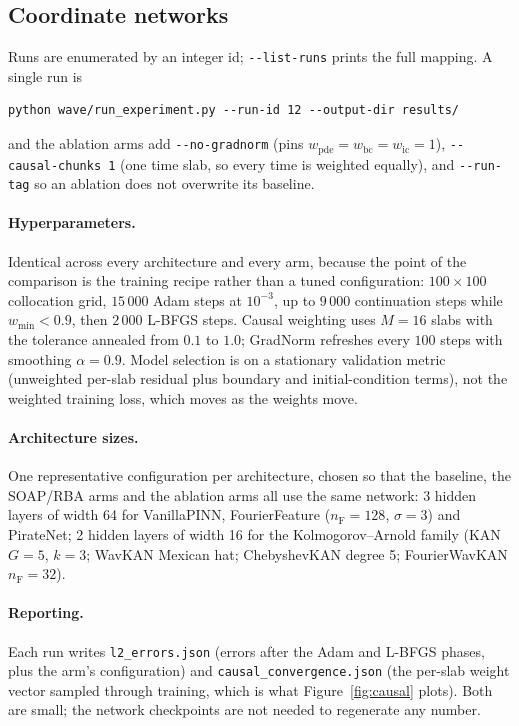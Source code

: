 \subsection{Coordinate networks}

Runs are enumerated by an integer id; \verb|--list-runs| prints the full
mapping. A single run is

\begin{verbatim}
python wave/run_experiment.py --run-id 12 --output-dir results/
\end{verbatim}

and the ablation arms add \verb|--no-gradnorm| (pins
$w_{\mathrm{pde}} = w_{\mathrm{bc}} = w_{\mathrm{ic}} = 1$),
\verb|--causal-chunks 1| (one time slab, so every time is weighted equally),
and \verb|--run-tag| so an ablation does not overwrite its baseline.

\paragraph{Hyperparameters.} Identical across every architecture and every arm,
because the point of the comparison is the training recipe rather than a tuned
configuration: $100 \times 100$ collocation grid, $15\,000$ Adam steps at
$10^{-3}$, up to $9\,000$ continuation steps while $w_{\min} < 0.9$, then
$2\,000$ L-BFGS steps. Causal weighting uses $M = 16$ slabs with the tolerance
annealed from $0.1$ to $1.0$; GradNorm refreshes every $100$ steps with
smoothing $\alpha = 0.9$. Model selection is on a stationary validation metric
(unweighted per-slab residual plus boundary and initial-condition terms), not
the weighted training loss, which moves as the weights move.

\paragraph{Architecture sizes.} One representative configuration per
architecture, chosen so that the baseline, the SOAP/RBA arms and the ablation
arms all use the same network: 3 hidden layers of width 64 for VanillaPINN,
FourierFeature ($n_{\mathrm{F}} = 128$, $\sigma = 3$) and PirateNet; 2 hidden
layers of width 16 for the Kolmogorov--Arnold family (KAN $G = 5$, $k = 3$;
WavKAN Mexican hat; ChebyshevKAN degree 5; FourierWavKAN
$n_{\mathrm{F}} = 32$).

\paragraph{Reporting.} Each run writes \verb|l2_errors.json| (errors after the
Adam and L-BFGS phases, plus the arm's configuration) and
\verb|causal_convergence.json| (the per-slab weight vector sampled through
training, which is what Figure~\ref{fig:causal} plots). Both are small; the
network checkpoints are not needed to regenerate any number.

